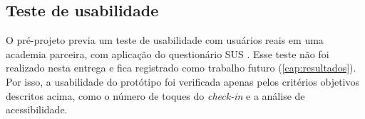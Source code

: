 \subsection{Teste de usabilidade}

O pré-projeto previa um teste de usabilidade com usuários reais em uma
academia parceira, com aplicação do questionário SUS \cite{brooke1996}.
Esse teste não foi realizado nesta entrega e fica registrado como
trabalho futuro (\autoref{cap:resultados}). Por isso, a usabilidade do
protótipo foi verificada apenas pelos critérios objetivos descritos
acima, como o número de toques do \textit{check-in} e a análise de
acessibilidade.
